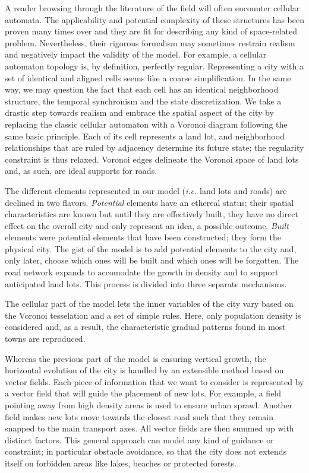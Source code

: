 \documentclass[12pt]{article}
\begin{document}
A reader browsing through the literature of the field will often
encounter cellular automata. The applicability and potential
complexity of these structures has been proven many times over and
they are fit for describing any kind of space-related
problem. Nevertheless, their rigorous formalism may sometimes restrain
realism and negatively impact the validity of the model. For example,
a cellular automaton topology is, by definition, perfectly
regular. Representing a city with a set of identical and aligned cells
seems like a coarse simplification. In the same way, we may question
the fact that each cell has an identical neighborhood structure, the
temporal synchronism and the state discretization. We take a drastic
step towards realism and embrace the spatial aspect of the city by
replacing the classic cellular automaton with a Voronoi diagram
following the same basic principle. Each of its cell represents a land
lot, and neighborhood relationships that are ruled by adjacency
determine its future state; the regularity constraint is thus
relaxed. Voronoi edges delineate the Voronoi space of land lots and,
as such, are ideal supports for roads.

The different elements represented in our model (\textit{i.e.} land
lots and roads) are declined in two flavors. \textit{Potential}
elements have an ethereal status; their spatial characteristics are
known but until they are effectively built, they have no direct effect
on the overall city and only represent an idea, a possible
outcome. \textit{Built} elements were potential elements that have
been constructed; they form the physical city. The gist of the model
is to add potential elements to the city and, only later, choose which
ones will be built and which ones will be forgotten. The road network
expands to accomodate the growth in density and to support anticipated
land lots. This process is divided into three separate mechanisms.

The cellular part of the model lets the inner variables of the city
vary based on the Voronoi tesselation and a set of simple rules. Here,
only population density is considered and, as a result, the
characteristic gradual patterns found in most towns are reproduced.

Whereas the previous part of the model is ensuring vertical growth,
the horizontal evolution of the city is handled by an extensible
method based on vector fields. Each piece of information that we want
to consider is represented by a vector field that will guide the
placement of new lots. For example, a field pointing away from high
density areas is used to ensure urban sprawl. Another field makes new
lots move towards the closest road such that they remain snapped to
the main transport axes. All vector fields are then summed up with
distinct factors. This general approach can model any kind of guidance
or constraint; in particular obstacle avoidance, so that the city
does not extends itself on forbidden areas like lakes, beaches or
protected forests.
\end{document}
